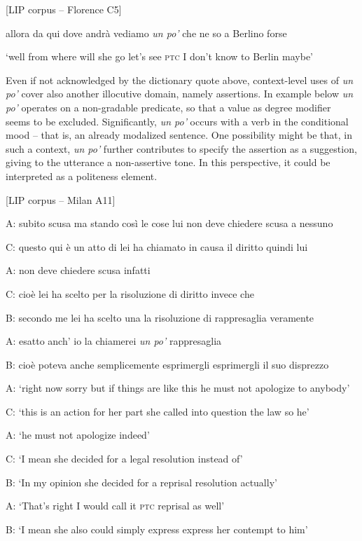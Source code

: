 \ea%
    \label{ex:key:60}
 [LIP corpus – Florence C5]

allora da qui dove andrà vediamo \textit{un po’} che ne so a Berlino forse

\glt ‘well from where will she go let’s see \textsc{ptc} I don’t know to Berlin maybe’
\z

Even if not acknowledged by the dictionary quote above, context-level uses of \textit{un po’} cover also another illocutive domain, namely assertions. In example  below \textit{un po’} operates on a non-gradable predicate, so that a value as degree modifier seems to be excluded. Significantly, \textit{un po’} occurs with a verb in the conditional mood – that is, an already modalized sentence. One possibility might be that, in such a context, \textit{un po’} further contributes to specify the assertion as a suggestion, giving to the utterance a non-assertive tone. In this perspective, it could be interpreted as a politeness element.

\ea%
    \label{ex:key:61}

          [LIP corpus – Milan A11]

A:   subito scusa ma stando così le cose lui non deve chiedere scusa a nessuno

C:   questo qui è un atto di lei ha chiamato in causa il diritto quindi lui

A:   non deve chiedere scusa infatti

C:   cioè lei ha scelto per la risoluzione di diritto invece che

B:   secondo me lei ha scelto una la risoluzione di rappresaglia veramente

A:   esatto anch’ io la chiamerei \textit{un po’} rappresaglia

B:   cioè poteva anche semplicemente esprimergli esprimergli il suo disprezzo

\glt
A:  ‘right now sorry but if things are like this he must not apologize to anybody’

C:  ‘this is an action for her part she called into question the law so he’

A:  ‘he must not apologize indeed’

C:  ‘I mean she decided for a legal resolution instead of’

B:   ‘In my opinion she decided for a reprisal resolution actually’

A:  ‘That’s right I would call it \textsc{ptc} reprisal as well’

B:  ‘I mean she also could simply express express her contempt to him’
    \z %

